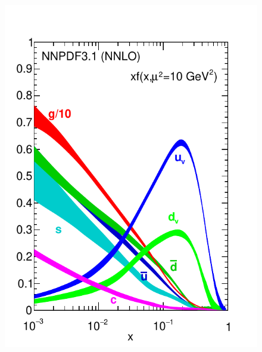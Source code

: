 \begin{figure}[t]
\begin{center}
  \includegraphics[scale=0.65]{Strong-Interaction/nnpdf31nnlo-10.pdf}

\end{center}
\end{figure}
